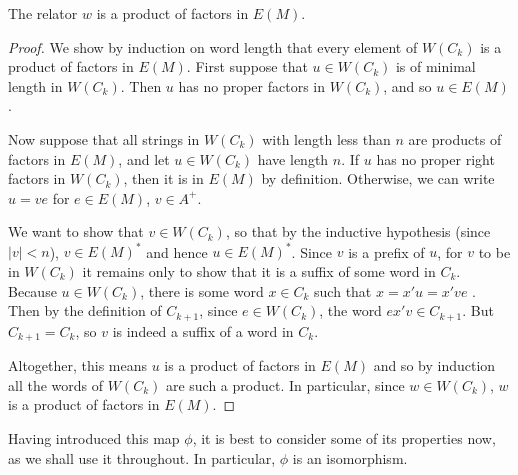 \documentclass[noindex,noinsetproof,emphthm,12pt]{lmaths}
\begin{document}
\begin{prop} \label{lma:relator-factors-E(M)}
	The relator $w$ is a product of factors in $E(M)$.
\end{prop}
\begin{proof}
	\hspace{-0.25mm}We show by induction on word length that every element of $W(C_k)$ is a product of factors in $E(M)$. First suppose that $u \in W(C_k)$ is of minimal length in $W(C_k)$. Then $u$ has no proper factors in $W(C_k)$, and so $u \in E(M)$.

	Now suppose that all strings in $W(C_k)$ with length less than $n$ are products of factors in $E(M)$, and let $u \in W(C_k)$ have length $n$. If $u$ has no proper right factors in $W(C_k)$, then it is in $E(M)$ by definition. Otherwise, we can write $u = ve$ for $e \in E(M)$, $v \in A^+$.

	We want to show that $v \in W(C_k)$, so that by the inductive hypothesis (since $|v| < n$), $v \in E(M)^*$ and hence $u \in E(M)^*$. Since $v$ is a prefix of $u$, for $v$ to be in $W(C_k)$ it remains only to show that it is a suffix of some word in $C_k$. Because $u \in W(C_k)$, there is some word $x \in C_k$ such that $x = x'u = x've$ . Then by the definition of $C_{k+1}$, since $e \in W(C_k)$, the word $ex'v \in C_{k+1}$. But $C_{k+1} = C_k$, so $v$ is indeed a suffix of a word in $C_k$.

	Altogether, this means $u$ is a product of factors in $E(M)$ and so by induction all the words of $W(C_k)$ are such a product. In particular, since $w \in W(C_k)$, $w$ is a product of factors in $E(M)$.
\end{proof}

Having introduced this map $\phi$, it is best to consider some of its properties now, as we shall use it throughout. In particular, $\phi$ is an isomorphism.
\end{document}
